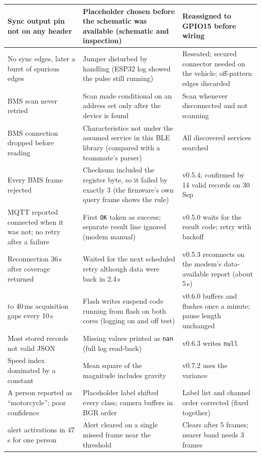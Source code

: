 \begin{longtable}{|>{\raggedright\arraybackslash}p{3.6cm}|>{\raggedright\arraybackslash}p{5.0cm}|>{\raggedright\arraybackslash}p{4.9cm}|}
Sync output pin not on any header & Placeholder chosen before the schematic was available (schematic and inspection) & Reassigned to GPIO15 before wiring \\ \hline
No sync edges, later a burst of spurious edges & Jumper disturbed by handling (ESP32 log showed the pulse still running) & Reseated; secured connector needed on the vehicle; off-pattern edges discarded \\ \hline
BMS scan never retried & Scan made conditional on an address set only after the device is found & Scan whenever disconnected and not scanning \\ \hline
BMS connection dropped before reading & Characteristics not under the assumed service in this BLE library (compared with a teammate's parser) & All discovered services searched \\ \hline
Every BMS frame rejected & Checksum included the register byte, so it failed by exactly 3 (the firmware's own query frame shows the rule) & v0.5.4; confirmed by 14 valid records on 30 Sep \\ \hline
MQTT reported connected when it was not; no retry after a failure & First \texttt{OK} taken as success; separate result line ignored (modem manual) & v0.5.0 waits for the result code; retry with backoff \\ \hline
Reconnection 36\,s after coverage returned & Waited for the next scheduled retry although data were back in 2.4\,s & v0.5.3 reconnects on the modem's data-available report (about 5\,s) \\ \hline
33 to 40\,ms acquisition gaps every 10\,s & Flash writes suspend code running from flash on both cores (logging on and off test) & v0.6.0 buffers and flushes once a minute; pause length unchanged \\ \hline
Most stored records not valid JSON & Missing values printed as \texttt{nan} (full log read-back) & v0.6.3 writes \texttt{null} \\ \hline
Speed index dominated by a constant & Mean square of the magnitude includes gravity & v0.7.2 uses the variance \\ \hline
A person reported as ``motorcycle''; poor confidence & Placeholder label shifted every class; camera buffers in BGR order & Label list and channel order corrected (fixed together) \\ \hline
16 alert activations in 47\,s for one person & Alert cleared on a single missed frame near the threshold & Clears after 5 frames; nearer band needs 3 frames \\ \hline

\end{longtable}
